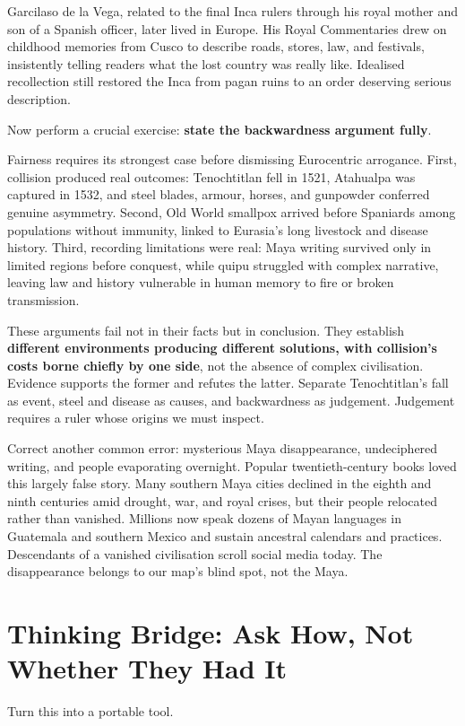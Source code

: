 Garcilaso de la Vega, related to the final Inca rulers through his royal mother and son of a Spanish officer, later lived in Europe. His Royal Commentaries drew on childhood memories from Cusco to describe roads, stores, law, and festivals, insistently telling readers what the lost country was really like. Idealised recollection still restored the Inca from pagan ruins to an order deserving serious description.

Now perform a crucial exercise: \textbf{state the backwardness argument fully}.

Fairness requires its strongest case before dismissing Eurocentric arrogance. First, collision produced real outcomes: Tenochtitlan fell in 1521, Atahualpa was captured in 1532, and steel blades, armour, horses, and gunpowder conferred genuine asymmetry. Second, Old World smallpox arrived before Spaniards among populations without immunity, linked to Eurasia's long livestock and disease history. Third, recording limitations were real: Maya writing survived only in limited regions before conquest, while quipu struggled with complex narrative, leaving law and history vulnerable in human memory to fire or broken transmission.

These arguments fail not in their facts but in conclusion. They establish \textbf{different environments producing different solutions, with collision's costs borne chiefly by one side}, not the absence of complex civilisation. Evidence supports the former and refutes the latter. Separate Tenochtitlan's fall as event, steel and disease as causes, and backwardness as judgement. Judgement requires a ruler whose origins we must inspect.

Correct another common error: mysterious Maya disappearance, undeciphered writing, and people evaporating overnight. Popular twentieth-century books loved this largely false story. Many southern Maya cities declined in the eighth and ninth centuries amid drought, war, and royal crises, but their people relocated rather than vanished. Millions now speak dozens of Mayan languages in Guatemala and southern Mexico and sustain ancestral calendars and practices. Descendants of a vanished civilisation scroll social media today. The disappearance belongs to our map's blind spot, not the Maya.

\section[Thinking Bridge: Solving Problems]{Thinking Bridge: Ask How, Not Whether They Had It}
Turn this into a portable tool.

